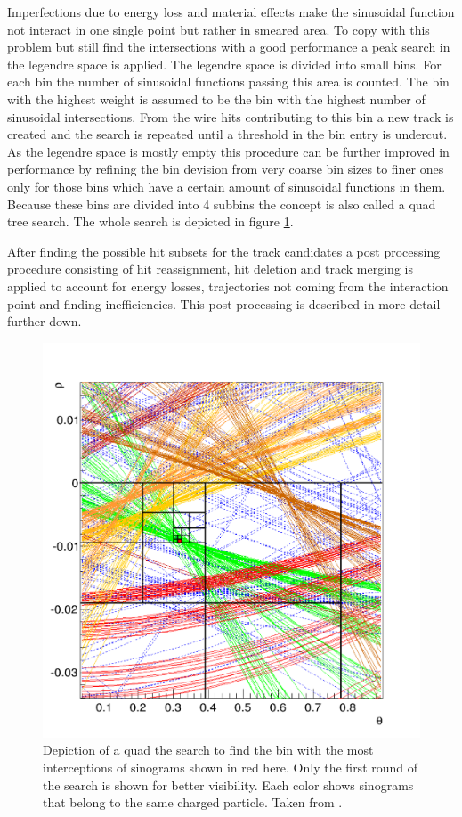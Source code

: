 Imperfections due to energy loss and material effects make the sinusoidal function not interact in one single point but rather in smeared area. To copy with this problem but still find the intersections with a good performance a peak search in the legendre space is applied. The legendre space is divided into small bins. For each bin the number of sinusoidal functions passing this area is counted. The bin with the highest weight is assumed to be the bin with the highest number of sinusoidal intersections. From the wire hits contributing to this bin a new track is created and the search is repeated until a threshold in the bin entry is undercut. As the legendre space is mostly empty this procedure can be further improved in performance by refining the bin devision from very coarse bin sizes to finer ones only for those bins which have a certain amount of sinusoidal functions in them. Because these bins are divided into 4 subbins the concept is also called a quad tree search. The whole search is depicted in figure \ref{fig-quad-tree-search}.

After finding the possible hit subsets for the track candidates a post processing procedure consisting of hit reassignment, hit deletion and track merging is applied to account for energy losses, trajectories not coming from the interaction point and finding inefficiencies. This post processing is described in more detail further down.

\begin{figure}
  \centering
  \includegraphics[width=0.6\linewidth]{figures/theory/quad_tree.png}
  \caption{Depiction of a quad the search to find the bin with the most interceptions of sinograms shown in red here. Only the first round of the search is shown for better visibility. Each color shows sinograms that belong to the same charged particle. Taken from \cite{viktor_dpg}.}
  \label{fig-quad-tree-search}
\end{figure}


